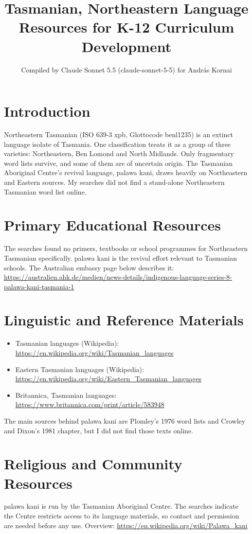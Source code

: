 \documentclass[12pt]{article}
\title{Tasmanian, Northeastern Language Resources for K-12 Curriculum Development}
\author{Compiled by Claude Sonnet 5.5 (claude-sonnet-5-5) for Andr\'as Kornai}
\date{}
\begin{document}
\maketitle

\section{Introduction}
Northeastern Tasmanian (ISO 639-3 xpb, Glottocode benl1235) is an extinct language isolate of Tasmania. One classification treats it as a group of three varieties: Northeastern, Ben Lomond and North Midlands. Only fragmentary word lists survive, and some of them are of uncertain origin. The Tasmanian Aboriginal Centre's revival language, palawa kani, draws heavily on Northeastern and Eastern sources. My searches did not find a stand-alone Northeastern Tasmanian word list online.

\section{Primary Educational Resources}
The searches found no primers, textbooks or school programmes for Northeastern Tasmanian specifically. palawa kani is the revival effort relevant to Tasmanian schools. The Australian embassy page below describes it: \url{https://australien.ahk.de/medien/news-details/indigenous-language-series-8-palawa-kani-tasmania-1}

\section{Linguistic and Reference Materials}
\begin{itemize}
\item Tasmanian languages (Wikipedia): \url{https://en.wikipedia.org/wiki/Tasmanian_languages}
\item Eastern Tasmanian languages (Wikipedia): \url{https://en.wikipedia.org/wiki/Eastern_Tasmanian_languages}
\item Britannica, Tasmanian languages: \url{https://www.britannica.com/print/article/583948}
\end{itemize}
The main sources behind palawa kani are Plomley's 1976 word lists and Crowley and Dixon's 1981 chapter, but I did not find those texts online.

\section{Religious and Community Resources}
palawa kani is run by the Tasmanian Aboriginal Centre. The searches indicate the Centre restricts access to its language materials, so contact and permission are needed before any use. Overview: \url{https://en.wikipedia.org/wiki/Palawa_kani}
\end{document}
